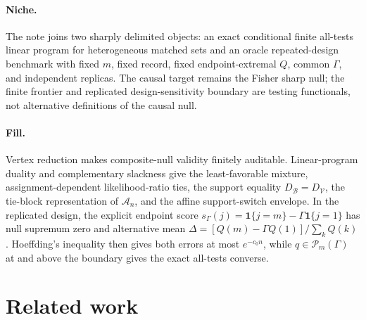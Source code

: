 \documentclass{article}
\begin{document}
\paragraph{Niche.} The note joins two sharply delimited objects: an exact conditional finite all-tests linear program for heterogeneous matched sets and an oracle repeated-design benchmark with fixed \(m\), fixed record, fixed endpoint-extremal \(Q\), common \(\Gamma\), and independent replicas. The causal target remains the Fisher sharp null; the finite frontier and replicated design-sensitivity boundary are testing functionals, not alternative definitions of the causal null.

\paragraph{Fill.} Vertex reduction makes composite-null validity finitely auditable. Linear-program duality and complementary slackness give the least-favorable mixture, assignment-dependent likelihood-ratio ties, the support equality \(D_{\mathcal B}=D_{\mathcal V}\), the tie-block representation of \(\mathcal A_n\), and the affine support-switch envelope. In the replicated design, the explicit endpoint score \(s_\Gamma(j)=\mathbf1\{j=m\}-\Gamma\mathbf1\{j=1\}\) has null supremum zero and alternative mean \(\Delta=[Q(m)-\Gamma Q(1)]/\sum_kQ(k)\). Hoeffding's inequality then gives both errors at most \(e^{-c_0n}\), while \(q\in\mathcal P_m(\Gamma)\) at and above the boundary gives the exact all-tests converse.

\section{Related work}
\end{document}
